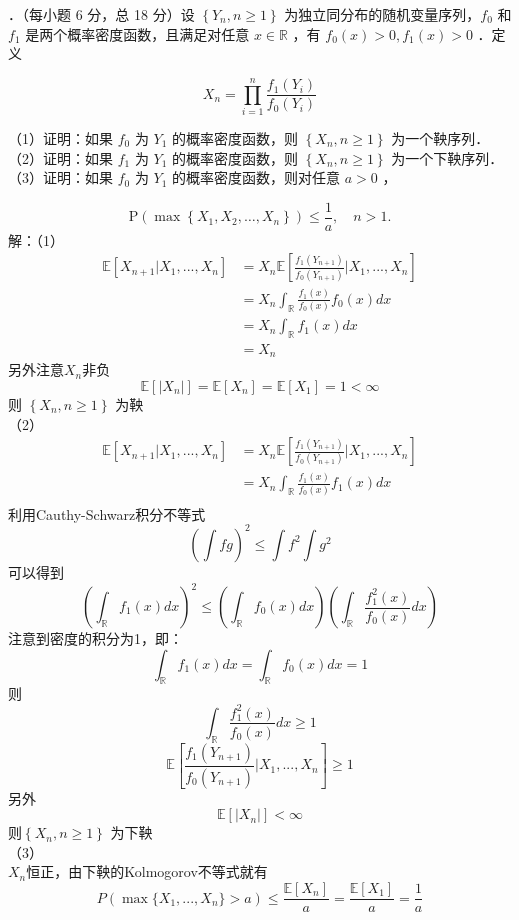 \documentclass[UTF8,openany]{book}
\begin{document}
．（每小题 6 分，总 18 分）设 $\left\{Y_{n}, n \geq 1\right\}$ 为独立同分布的随机变量序列，$f_{0}$ 和 $f_{1}$ 是两个概率密度函数，且满足对任意 $x \in \mathbb{R}$ ，有 $f_{0}(x)>0, f_{1}(x)>0$ ．定义

$$
X_{n}=\prod_{i=1}^{n} \frac{f_{1}\left(Y_{i}\right)}{f_{0}\left(Y_{i}\right)}
$$

\noindent （1）证明：如果 $f_{0}$ 为 $Y_{1}$ 的概率密度函数，则 $\left\{X_{n}, n \geq 1\right\}$ 为一个鞅序列．\\
（2）证明：如果 $f_{1}$ 为 $Y_{1}$ 的概率密度函数，则 $\left\{X_{n}, n \geq 1\right\}$ 为一个下鞅序列．\\
（3）证明：如果 $f_{0}$ 为 $Y_{1}$ 的概率密度函数，则对任意 $a>0$ ，

$$
\mathrm{P}\left(\max \left\{X_{1}, X_{2}, \ldots, X_{n}\right\} \right) \leq \frac{1}{a}, \quad n>1 .
$$
解：（1）\\
$$
\begin{aligned}
	\mathbb{E}[X_{n+1}|X_1,...,X_n]&=X_n\mathbb{E}\left[ \frac{f_1(Y_{n+1})}{f_0(Y_{n+1})}|X_1,...,X_n\right] \\
	&=X_n \int_{\mathbb{R}} \frac{f_1(x)}{f_0(x)} f_0(x) dx\\
	&=X_n \int_{\mathbb{R}}f_1(x) dx\\
	&=X_n
\end{aligned}
$$
另外注意$X_n$非负
\[
\mathbb{E}[|X_n|]=\mathbb{E}[X_n]=\mathbb{E}[X_1]=1<\infty
\]
则 $\left\{X_{n}, n \geq 1\right\}$ 为鞅\\
（2）\\
$$
\begin{aligned}
	\mathbb{E}[X_{n+1}|X_1,...,X_n]&=X_n\mathbb{E}\left[ \frac{f_1(Y_{n+1})}{f_0(Y_{n+1})}|X_1,...,X_n\right] \\
	&=X_n \int_{\mathbb{R}} \frac{f_1(x)}{f_0(x)} f_1(x) dx\\
\end{aligned}
$$
利用Cauthy-Schwarz积分不等式
\[
\left(\int fg \right)^2 \le \int f^2 \int g^2 
\]
可以得到
\[
\left(\int_{\mathbb{R}} f_1(x)dx \right)^2 \le \left(\int_{\mathbb{R}} f_0(x)dx \right)\left(\int_{\mathbb{R}} \frac{f_1^2(x)}{f_0(x)}dx \right)   
\]
注意到密度的积分为1，即：
$$\int_{\mathbb{R}} f_1(x)dx=\int_{\mathbb{R}} f_0(x)dx=1$$
则
\[
\int_{\mathbb{R}} \frac{f_1^2(x)}{f_0(x)}dx \ge 1
\]
\[
\mathbb{E}\left[ \frac{f_1(Y_{n+1})}{f_0(Y_{n+1})}|X_1,...,X_n\right] \ge 1
\]
另外
\[
\mathbb{E}[|X_n|]<\infty
\]
则$\left\{X_{n}, n \geq 1\right\}$ 为下鞅\\
（3）\\
$X_n$恒正，由下鞅的Kolmogorov不等式就有\\
\[
P(\max\{X_1,...,X_n\}>a) \le \frac{\mathbb{E}[X_n]}{a}=\frac{\mathbb{E}[X_1]}{a}=\frac{1}{a}
\]\\
\newpage
\end{document}
